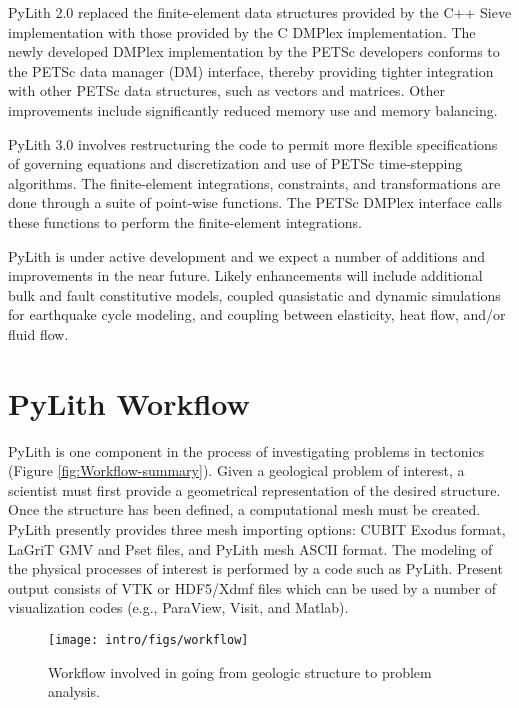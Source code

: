 PyLith 2.0 replaced the finite-element data structures provided by the
C++ Sieve implementation with those provided by the C DMPlex
implementation.  The newly developed DMPlex implementation by the
PETSc developers conforms to the PETSc data manager (DM) interface,
thereby providing tighter integration with other PETSc data
structures, such as vectors and matrices. Other improvements include
significantly reduced memory use and memory balancing.

PyLith 3.0 involves restructuring the code to permit more flexible
specifications of governing equations and discretization and use of
PETSc time-stepping algorithms. The finite-element integrations,
constraints, and transformations are done through a suite of
point-wise functions. The PETSc DMPlex interface calls these functions
to perform the finite-element integrations. 

PyLith is under active development and we expect a number of additions
and improvements in the near future. Likely enhancements will include
additional bulk and fault constitutive models, coupled quasistatic
and dynamic simulations for earthquake cycle modeling, and coupling
between elasticity, heat flow, and/or fluid flow.


\section{PyLith Workflow}

PyLith is one component in the process of investigating problems in
tectonics (Figure \vref{fig:Workflow-summary}). Given a geological
problem of interest, a scientist must first provide a geometrical
representation of the desired structure. Once the structure has been
defined, a computational mesh must be created. PyLith presently
provides three mesh importing options: CUBIT Exodus format, LaGriT GMV
and Pset files, and PyLith mesh ASCII format. The modeling of the
physical processes of interest is performed by a code such as
PyLith. Present output consists of VTK or HDF5/Xdmf files which can be
used by a number of visualization codes (e.g., ParaView, Visit, and
Matlab).

\begin{figure}[htbp]
  \texttt{[image: intro/figs/workflow]}
  \caption{Workflow involved in going from geologic structure to
    problem analysis.}
  \label{fig:Workflow-summary}
\end{figure}


